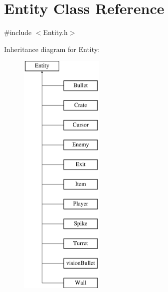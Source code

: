 \hypertarget{class_entity}{}\section{Entity Class Reference}
\label{class_entity}


{\ttfamily \#include $<$Entity.\+h$>$}

Inheritance diagram for Entity\+:\begin{figure}[H]
\begin{center}
\leavevmode
\includegraphics[height=12.000000cm]{class_entity}
\end{center}
\end{figure}
